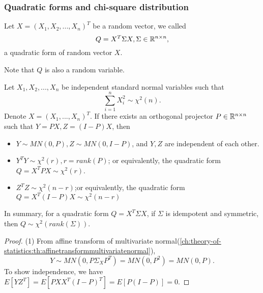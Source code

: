 \begin{refsection}
\subsubsection{Quadratic forms and chi-square distribution}
\begin{definition}\cite[485]{hoggintroduction}
Let $X=(X_1,X_2,...,X_n)^T$ be a random vector, we called $$Q = X^T\Sigma X,\Sigma\in \mathbb{R}^{n\times n},$$
a quadratic form of random vector  $X$.

Note that $Q$ is also a random variable.
\end{definition}


\begin{theorem}\label{ch:theory-of-statistics:th:chi-squareOrthogonalDecomposition}
Let $X_1,X_2,...,X_n$ be independent standard normal variables such that 
$$\sum_{i=1}^n X_i^2 \sim \chi^2(n). $$
Denote $X = (X_1,...,X_n)^T$.
If there exists an orthogonal projector	$P\in \mathbb{R}^{n\times n}$ such that $Y = PX, Z = (I-P)X$, then
\begin{itemize}
	\item $Y \sim MN(0,P), Z\sim MN(0, I-P)$, and $Y,Z$ are independent of each other.  
	\item $Y^TY \sim \chi^2(r), r = rank(P)$; or equivalently, the quadratic form $Q = X^TPX\sim \chi^2(r)$.
	\item $Z^TZ \sim \chi^2(n-r)$;or equivalently, the quadratic form $Q = X^T(I-P)X\sim \chi^2(n-r)$
\end{itemize} 
In summary, for a quadratic form $Q = X^T\Sigma X$, if $\Sigma$ is idempotent and symmetric, then $Q\sim \chi^2(rank(\Sigma))$.
\end{theorem}
\begin{proof}
(1) From affine transform of multivariate normal(\autoref{ch:theory-of-statistics:th:affinetransformmultivariatenormal}), $$Y\sim MN(0, P\Sigma_X P^T) = MN(0, P^2) = MN(0,P).$$
To show independence, we have $E[YZ^T] = E[PXX^T(I-P)^T] = E[P(I-P)] = 0$.


\end{proof}
\end{refsection}
